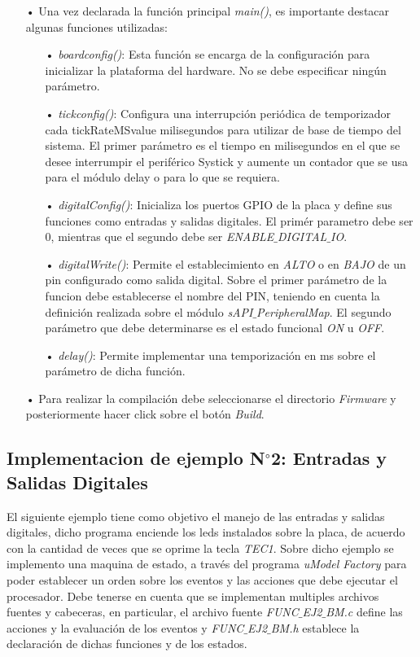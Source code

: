 \documentclass[12pt,letterpaper]{article}
\begin{document}
\begin{enumerate}
\item[•]Una vez declarada la función principal \textit{main()}, es importante destacar algunas funciones utilizadas:
\begin{enumerate}
\item[•]\textit{boardconfig()}: Esta función se encarga de la configuración para inicializar la plataforma del hardware. No se debe especificar ningún parámetro.
\item[•]\textit{tickconfig()}: Configura una interrupción periódica de temporizador cada tickRateMSvalue milisegundos para utilizar de base de tiempo del sistema. El primer parámetro es el tiempo en milisegundos en el que se desee interrumpir el periférico Systick y aumente un contador que se usa para el módulo delay o para lo que se requiera.
\item[•]\textit{digitalConfig()}: Inicializa los puertos GPIO de la placa y define sus funciones como entradas y salidas digitales. El primér parametro debe ser 0, mientras que el segundo debe ser \textit{ENABLE$\_$DIGITAL$\_$IO}.
\item[•]\textit{digitalWrite()}: Permite el establecimiento en \textit{ALTO} o en \textit{BAJO} de un pin configurado como salida digital. Sobre el primer parámetro de la funcion debe establecerse el nombre del PIN, teniendo en cuenta la definición realizada sobre el módulo \textit{sAPI$\_$PeripheralMap}. El segundo parámetro que debe determinarse es el estado funcional \textit{ON} u \textit{OFF}.
\item[•]\textit{delay()}: Permite implementar una temporización en ms sobre el parámetro de dicha función.
\end{enumerate}

\item[•]Para realizar la compilación debe seleccionarse el directorio \textit{Firmware} y posteriormente hacer click sobre el botón \textit{Build}.\end{enumerate}
\subsection{Implementacion de ejemplo N$^{\circ}$2: Entradas y Salidas Digitales}\label{sec:ej2sapi}

El siguiente ejemplo tiene como objetivo el manejo de las entradas y salidas digitales, dicho programa enciende los leds instalados sobre la placa, de acuerdo con la cantidad de veces que se oprime la tecla \textit{TEC1}. Sobre dicho ejemplo se implemento una maquina de estado, a través del programa \textit{uModel Factory} para poder establecer un orden sobre los eventos y las acciones que debe ejecutar el procesador. Debe tenerse en cuenta que se implementan multiples archivos fuentes y cabeceras, en particular, el archivo fuente \textit{FUNC$\_$EJ2$\_$BM.c} define las acciones y la evaluación de los eventos y \textit{FUNC$\_$EJ2$\_$BM.h} establece la declaración de dichas funciones y de los estados.
\end{document}
